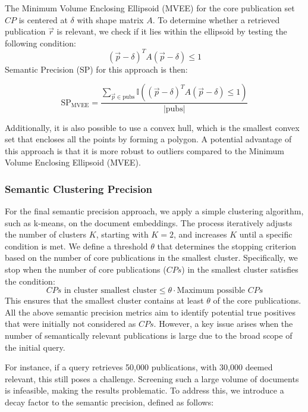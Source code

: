 The Minimum Volume Enclosing Ellipsoid (MVEE) for the core publication set $CP$ is centered at $\delta$ with shape matrix $A$. To determine whether a retrieved publication $\vec{r}$ is relevant, we check if it lies within the ellipsoid by testing the following condition:
\[
(\vec{p} - \delta)^T A (\vec{p} - \delta) \leq 1
\]
Semantic Precision (SP) for this approach is then:

\begin{equation}\label{eq:sp-mvee}
	\text{SP}_{\text{MVEE}} = \frac{\sum_{\vec{p} \in \text{pubs}} \mathbb{I} \left( (\vec{p} - \delta)^T A (\vec{p} - \delta) \leq 1 \right)}{|\text{pubs}|}
\end{equation}

Additionally, it is also possible to use a convex hull, which is the smallest convex set that encloses all the points by forming a polygon. A potential advantage of this approach is that it is more robust to outliers compared to the Minimum Volume Enclosing Ellipsoid (MVEE).

\subsubsection{Semantic Clustering Precision}

For the final semantic precision approach, we apply a simple clustering algorithm, such as k-means, on the document embeddings. The process iteratively adjusts the number of clusters \( K \), starting with \( K=2 \), and increases \( K \) until a specific condition is met. We define a threshold \( \theta \) that determines the stopping criterion based on the number of core publications in the smallest cluster. Specifically, we stop when the number of core publications (\( CPs \)) in the smallest cluster satisfies the condition:
\begin{equation}
CPs \text{ in cluster smallest cluster} \leq \theta \cdot \text{Maximum possible } CPs
 \end{equation}\label{eq:sp-clustering}
This ensures that the smallest cluster contains at least \( \theta \) of the core publications.
All the above semantic precision metrics aim to identify potential true positives that were initially not considered as \( CPs \). However, a key issue arises when the number of semantically relevant publications is large due to the broad scope of the initial query. 

For instance, if a query retrieves 50,000 publications, with 30,000 deemed relevant, this still poses a challenge. Screening such a large volume of documents is infeasible, making the results problematic. To address this, we introduce a decay factor to the semantic precision, defined as follows:

